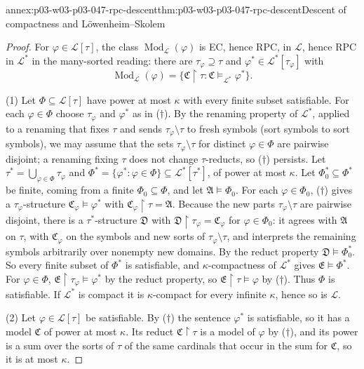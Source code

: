\begin{annexitem}{annex:p03-w03-p03-047-rpc-descent}{thm:p03-w03-p03-047-rpc-descent}{Descent of compactness and L\"owenheim--Skolem}
\begin{proof}
For \(\varphi\in\mathscr L[\tau]\), the class
\(\operatorname{Mod}_{\mathscr L}(\varphi)\) is EC, hence RPC, in
\(\mathscr L\), hence RPC in \(\mathscr L^*\) in the many-sorted reading:
there are \(\tau_\varphi\supseteq\tau\) and
\(\varphi^*\in\mathscr L^*[\tau_\varphi]\) with
\[
 \operatorname{Mod}_{\mathscr L}(\varphi)
 =\{\mathfrak C\restriction\tau:\mathfrak C\models_{\mathscr L^*}\varphi^*\}. \tag{\(\dagger\)}
\]

(1) Let \(\Phi\subseteq\mathscr L[\tau]\) have power at most \(\kappa\) with
every finite subset satisfiable.  For each \(\varphi\in\Phi\) choose
\(\tau_\varphi\) and \(\varphi^*\) as in (\(\dagger\)).  By the renaming
property of \(\mathscr L^*\), applied to a renaming that fixes \(\tau\) and
sends \(\tau_\varphi\setminus\tau\) to fresh symbols (sort symbols to sort
symbols), we may assume that the sets \(\tau_\varphi\setminus\tau\) for
distinct \(\varphi\in\Phi\) are pairwise disjoint; a renaming fixing
\(\tau\) does not change \(\tau\)-reducts, so (\(\dagger\)) persists.  Let
\(\tau^*=\bigcup_{\varphi\in\Phi}\tau_\varphi\) and
\(\Phi^*=\{\varphi^*:\varphi\in\Phi\}\subseteq\mathscr L^*[\tau^*]\), of
power at most \(\kappa\).  Let \(\Phi_0^*\subseteq\Phi^*\) be finite, coming
from a finite \(\Phi_0\subseteq\Phi\), and let \(\mathfrak A\models\Phi_0\).
For each \(\varphi\in\Phi_0\), (\(\dagger\)) gives a
\(\tau_\varphi\)-structure \(\mathfrak C_\varphi\models\varphi^*\) with
\(\mathfrak C_\varphi\restriction\tau=\mathfrak A\).  Because the new parts
\(\tau_\varphi\setminus\tau\) are pairwise disjoint, there is a
\(\tau^*\)-structure \(\mathfrak D\) with
\(\mathfrak D\restriction\tau_\varphi=\mathfrak C_\varphi\) for
\(\varphi\in\Phi_0\): it agrees with \(\mathfrak A\) on \(\tau\), with
\(\mathfrak C_\varphi\) on the symbols and new sorts of
\(\tau_\varphi\setminus\tau\), and interprets the remaining symbols
arbitrarily over nonempty new domains.  By the reduct property
\(\mathfrak D\models\Phi_0^*\).  So every finite subset of \(\Phi^*\) is
satisfiable, and \(\kappa\)-compactness of \(\mathscr L^*\) gives
\(\mathfrak E\models\Phi^*\).  For \(\varphi\in\Phi\),
\(\mathfrak E\restriction\tau_\varphi\models\varphi^*\) by the reduct
property, so \(\mathfrak E\restriction\tau\models\varphi\) by (\(\dagger\)).
Thus \(\Phi\) is satisfiable.  If \(\mathscr L^*\) is compact it is
\(\kappa\)-compact for every infinite \(\kappa\), hence so is
\(\mathscr L\).

(2) Let \(\varphi\in\mathscr L[\tau]\) be satisfiable.  By (\(\dagger\)) the
sentence \(\varphi^*\) is satisfiable, so it has a model \(\mathfrak C\) of
power at most \(\kappa\).  Its reduct \(\mathfrak C\restriction\tau\) is a
model of \(\varphi\) by (\(\dagger\)), and its power is a sum over the sorts
of \(\tau\) of the same cardinals that occur in the sum for \(\mathfrak C\),
so it is at most \(\kappa\).
\end{proof}
\end{annexitem}

